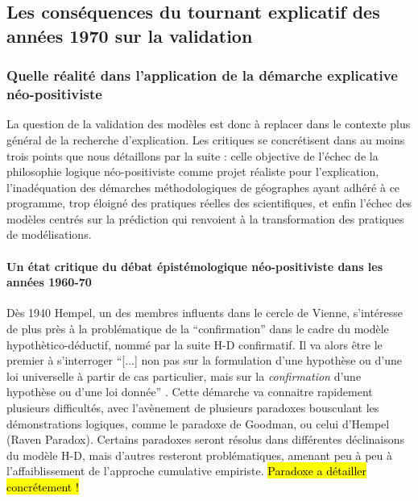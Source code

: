 
\subsection{Les conséquences du tournant explicatif des années 1970 sur la validation}
\label{ssec:transition_annee70}

\subsubsection{Quelle réalité dans l'application de la démarche explicative néo-positiviste}
\label{sssec:realite_neopositiviste}

La question de la validation des modèles est donc à replacer dans le contexte plus général de la recherche d'explication. Les critiques se concrétisent dans au moins trois points que nous détaillons par la suite : celle objective de l'échec de la philosophie logique néo-positiviste comme projet réaliste pour l'explication, l'inadéquation des démarches méthodologiques de géographes ayant adhéré à ce programme, trop éloigné des pratiques réelles des scientifiques, et enfin l’échec des modèles centrés sur la prédiction qui renvoient à la transformation des pratiques de modélisations.

\paragraph{Un état critique du débat épistémologique néo-positiviste dans les années 1960-70}
\label{p:critique_debat}

Dès 1940 Hempel, un des membres influents dans le cercle de Vienne, s'intéresse de plus près à la problématique de la \enquote{confirmation} dans le cadre du modèle hypothètico-déductif, nommé par la suite H-D confirmatif. Il va alors être le premier à s'interroger \enquote{[...] non pas sur la formulation d'une hypothèse ou d'une loi universelle à partir de cas particulier, mais sur la \textit{confirmation} d'une hypothèse ou d'une loi donnée} \autocite{Lecourt2006}. Cette démarche va connaitre rapidement plusieurs difficultés, avec l’avènement de plusieurs paradoxes bousculant les démonstrations logiques, comme le paradoxe de Goodman, ou celui d'Hempel (Raven Paradox). Certains paradoxes seront résolus dans différentes déclinaisons du modèle H-D, mais d'autres resteront problématiques, amenant peu à peu à l'affaiblissement de l'approche cumulative empiriste. \hl{Paradoxe a détailler concrétement !}

